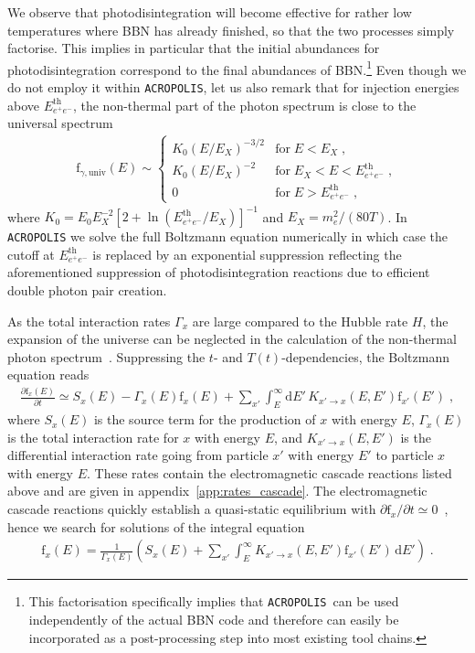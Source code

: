 \documentclass[11pt,a4paper]{article}
\newcommand{\fpdi}{\mathrm{f}}
\renewcommand{\d}{\text{d}}
\newcommand{\eqsp}{\;}
\newcommand{\X}{x}
\newcommand{\acropolis}{\texttt{ACROPOLIS}~}
\begin{document}
We observe that photodisintegration will become effective for rather low temperatures where BBN has already finished, so that the two processes simply factorise.
This implies in particular that the initial abundances for photodisintegration correspond to the final abundances of BBN.\footnote{This factorisation specifically implies that \acropolis can be used independently of the actual BBN code and therefore can easily be incorporated as a post-processing step into most existing tool chains.}
Even though we do not employ it within \texttt{ACROPOLIS}, let us also remark that for injection energies above $E_{e^+ e^-}^\mathrm{th}$, the non-thermal part of the photon spectrum is close to the universal spectrum~\cite{Cyburt:2002uv}
\begin{align}
\mathrm{f}_{\gamma, \mathrm{univ}} (E) \sim \begin{cases} K_0 (E/E_X)^{-3/2} &\text{for} \; E < E_X\eqsp, \\
K_0 (E/E_X)^{-2} &\text{for} \; E_X < E < E_{e^+ e^-}^\mathrm{th}\eqsp, \\
0 &\text{for} \; E > E_{e^+ e^-}^\mathrm{th}\eqsp, \end{cases}
\end{align}
where $K_0 = E_0 E_X^{-2} [2 + \ln (E_{e^+ e^-}^\mathrm{th} / E_X)]^{-1}$ and $E_X = m_e^2 / (80 T)$. In \texttt{ACROPOLIS} we solve the full Boltzmann equation numerically in which case
the cutoff at $E_{e^+ e^-}^\mathrm{th}$ is replaced by an exponential suppression
reflecting the aforementioned suppression of photodisintegration reactions due to efficient double photon pair creation.

As the total interaction rates $\Gamma_x$ are large compared to the Hubble rate $H$, the expansion of the universe can be neglected in the calculation of the non-thermal photon spectrum~\cite{Cyburt:2002uv,Jedamzik:2006xz}. Suppressing the $t$- and $T(t)$-dependencies, the Boltzmann equation reads
\begin{align}
\frac{\partial \fpdi_\X(E)}{\partial t} \simeq S_\X(E) - \Gamma_\X(E)\fpdi_\X(E) + \sum_{\X'}\int_E^\infty \d E' \, K_{\X' \rightarrow \X}(E, E')\fpdi_{\X'}(E')\eqsp,
\label{eq:boltzmann_cascade}
\end{align}
where $S_x (E)$ is the source term for the production of $x$ with energy $E$, $\Gamma_x (E)$ is the total interaction rate for $x$ with energy $E$, and $K_{x' \rightarrow x} (E, E')$ is the differential interaction rate going from particle $x'$ with energy $E'$ to particle $x$ with energy $E$. These rates contain the electromagnetic cascade reactions listed above and are given in appendix~\ref{app:rates_cascade}. The electromagnetic cascade reactions quickly establish a quasi-static equilibrium with $\partial \fpdi_x / \partial t \simeq 0$~\cite{Cyburt:2002uv,Jedamzik:2006xz}, hence we search for solutions of the integral equation
\begin{align}
\fpdi_\X(E) = \frac{1}{\Gamma_\X(E)} \left( S_\X(E) + \sum_{\X'} \int_E^\infty K_{\X' \rightarrow \X}(E, E')\fpdi_{\X'}(E')\,\d E' \right)\eqsp.
\label{eq:cascade_f}
\end{align}
\end{document}
